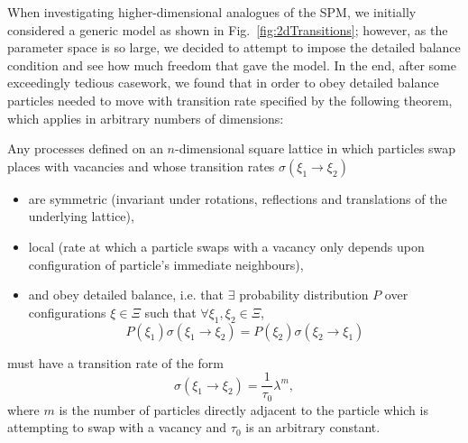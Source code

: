When investigating higher-dimensional analogues of the SPM, we initially considered a generic model as shown in Fig.~\ref{fig:2dTransitions}; however, as the parameter space is so large, we decided to attempt to impose the detailed
balance condition and see how much freedom that gave the model. In the end, after some exceedingly tedious casework, we found that in order to obey detailed balance particles needed to move with transition rate
specified by the following theorem, which applies in arbitrary numbers of dimensions:
\begin{theorem}
\label{thm:ndSPM}
 Any processes defined on an $n$-dimensional square lattice in which particles swap places with vacancies and whose transition rates $\sigma(\xi_1 \rightarrow \xi_2)$
 \begin{itemize}
  \item are symmetric (invariant under rotations, reflections and translations of the underlying lattice),
  \item local (rate at which a particle swaps with a vacancy only depends upon configuration of particle's immediate neighbours),
  \item and obey detailed balance, i.e. that $\exists$ probability distribution $P$ over configurations $\xi \in \Xi$ such that $\forall \xi_1 , \xi_2 \in \Xi $,
  \begin{equation}
    P(\xi_1) \sigma(\xi_1 \rightarrow \xi_2) = P(\xi_2) \sigma(\xi_2 \rightarrow \xi_1)
  \end{equation}  
 \end{itemize}
must have a transition rate of the form
\begin{equation}
 \sigma(\xi_1 \rightarrow \xi_2) = \frac{1}{\tau_0} \lambda^m ,
\end{equation}
where $m$ is the number of particles directly adjacent to the particle which is attempting to swap with a vacancy and $\tau_0$ is an arbitrary constant.
\end{theorem}

